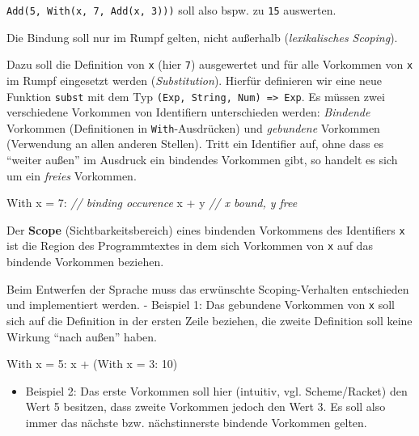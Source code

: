 \documentclass[]{article}
\newenvironment{Shaded}{}{}
\newcommand{\CommentTok}[1]{\textcolor[rgb]{0.38,0.63,0.69}{\textit{#1}}}
\newcommand{\DecValTok}[1]{\textcolor[rgb]{0.25,0.63,0.44}{#1}}
\newcommand{\NormalTok}[1]{#1}
\providecommand{\tightlist}{%
  \setlength{\itemsep}{0pt}\setlength{\parskip}{0pt}}
\begin{document}
\texttt{Add(5,\ With(x,\ 7,\ Add(x,\ 3)))} soll also bspw. zu
\texttt{15} auswerten.

Die Bindung soll nur im Rumpf gelten, nicht außerhalb
(\emph{lexikalisches Scoping}).

Dazu soll die Definition von \texttt{x} (hier \texttt{7}) ausgewertet
und für alle Vorkommen von \texttt{x} im Rumpf eingesetzt werden
(\emph{Substitution}). Hierfür definieren wir eine neue Funktion
\texttt{subst} mit dem Typ
\texttt{(Exp,\ String,\ Num)\ =\textgreater{}\ Exp}. Es müssen zwei
verschiedene Vorkommen von Identifiern unterschieden werden:
\emph{Bindende} Vorkommen (Definitionen in \texttt{With}-Ausdrücken) und
\emph{gebundene} Vorkommen (Verwendung an allen anderen Stellen). Tritt
ein Identifier auf, ohne dass es ``weiter außen'' im Ausdruck ein
bindendes Vorkommen gibt, so handelt es sich um ein \emph{freies}
Vorkommen.

\begin{Shaded}
\begin{Highlighting}[]
\NormalTok{With x = }\DecValTok{7}\NormalTok{: }\CommentTok{// binding occurence}
\NormalTok{  x + y }\CommentTok{// x bound, y free}
\end{Highlighting}
\end{Shaded}

Der \textbf{Scope} (Sichtbarkeitsbereich) eines bindenden Vorkommens des
Identifiers \texttt{x} ist die Region des Programmtextes in dem sich
Vorkommen von \texttt{x} auf das bindende Vorkommen beziehen.

Beim Entwerfen der Sprache muss das erwünschte Scoping-Verhalten
entschieden und implementiert werden. - Beispiel 1: Das gebundene
Vorkommen von \texttt{x} soll sich auf die Definition in der ersten
Zeile beziehen, die zweite Definition soll keine Wirkung ``nach außen''
haben.

\begin{Shaded}
\begin{Highlighting}[]
\NormalTok{With x = }\DecValTok{5}\NormalTok{:}
\NormalTok{  x + (With x = }\DecValTok{3}\NormalTok{: }\DecValTok{10}\NormalTok{)}
\end{Highlighting}
\end{Shaded}

\begin{itemize}
\tightlist
\item
  Beispiel 2: Das erste Vorkommen soll hier (intuitiv, vgl.
  Scheme/Racket) den Wert 5 besitzen, dass zweite Vorkommen jedoch den
  Wert 3. Es soll also immer das nächste bzw. nächstinnerste bindende
  Vorkommen gelten.
\end{itemize}
\end{document}
